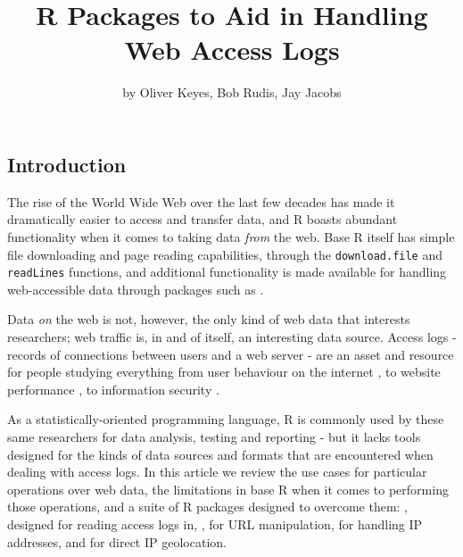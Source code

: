 \title{R Packages to Aid in Handling Web Access Logs}
\author{by Oliver Keyes, Bob Rudis, Jay Jacobs}

\maketitle


\subsection{Introduction}\label{introduction}

The rise of the World Wide Web over the last few decades has made it
dramatically easier to access and transfer data, and R \citep{RCore}
boasts abundant functionality when it comes to taking data \emph{from}
the web. Base R itself has simple file downloading and page reading
capabilities, through the \texttt{download.file} and \texttt{readLines}
functions, and additional functionality is made available for handling
web-accessible data through packages such as 
\citep{httr}.

Data \emph{on} the web is not, however, the only kind of web data that
interests researchers; web traffic is, in and of itself, an interesting
data source. Access logs - records of connections between users and a
web server - are an asset and resource for people studying everything
from user behaviour on the internet \citep{halfak}, to website
performance \citep{performance}, to information security
\citep{infosec}.

As a statistically-oriented programming language, R is commonly used by
these same researchers for data analysis, testing and reporting - but it
lacks tools designed for the kinds of data sources and formats that are
encountered when dealing with access logs. In this article we review the
use cases for particular operations over web data, the limitations in
base R when it comes to performing those operations, and a suite of R
packages designed to overcome them:  \citep{webreadr},
designed for reading access logs in, 
\citep{urltools}, for URL manipulation, 
\citep{iptools} for handling IP addresses, and 
\citep{rgeolocate} for direct IP geolocation.

